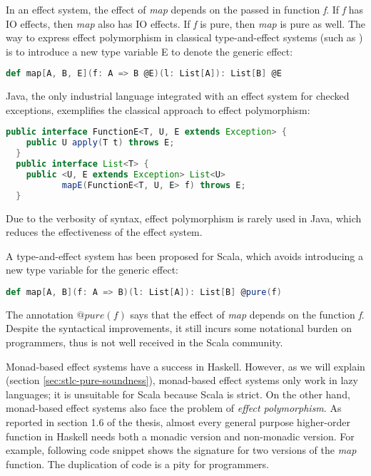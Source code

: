 In an effect system, the effect of \emph{map} depends on the passed in
function \emph{f}. If \emph{f} has IO effects, then \emph{map} also
has IO effects. If \emph{f} is pure, then \emph{map} is pure as
well. The way to express effect polymorphism in classical
type-and-effect systems (such as \cite{lucassen1988polymorphic}) is to
introduce a new type variable E to denote the generic effect:

\begin{lstlisting}[language=Scala]
def map[A, B, E](f: A => B @E)(l: List[A]): List[B] @E
\end{lstlisting}

Java, the only industrial language integrated with an effect system
for checked exceptions, exemplifies the classical approach to effect
polymorphism:

\begin{lstlisting}[language=Java]
  public interface FunctionE<T, U, E extends Exception> {
    public U apply(T t) throws E;
  }
  public interface List<T> {
    public <U, E extends Exception> List<U>
           mapE(FunctionE<T, U, E> f) throws E;
  }
\end{lstlisting}

Due to the verbosity of syntax, effect polymorphism is rarely used in
Java, which reduces the effectiveness of the effect system.

A type-and-effect system has been proposed for
Scala\cite{lukas2014effect}, which avoids introducing a new type
variable for the generic effect:

\begin{lstlisting}[language=Scala]
def map[A, B](f: A => B)(l: List[A]): List[B] @pure(f)
\end{lstlisting}

The annotation $@pure(f)$ says that the effect of \emph{map} depends
on the function \emph{f}. Despite the syntactical improvements, it
still incurs some notational burden on programmers, thus is not well
received in the Scala community.

Monad-based effect systems have a success in Haskell. However, as we
will explain (section \ref{sec:stlc-pure-soundness}), monad-based
effect systems only work in lazy languages; it is unsuitable for Scala
because Scala is strict. On the other hand, monad-based effect systems
also face the problem of \emph{effect polymorphism}. As reported in
section 1.6 of the thesis\cite{lippmeier2009type}, almost every
general purpose higher-order function in Haskell needs both a monadic
version and non-monadic version. For example, following code snippet
shows the signature for two versions of the \emph{map} function. The
duplication of code is a pity for programmers.

